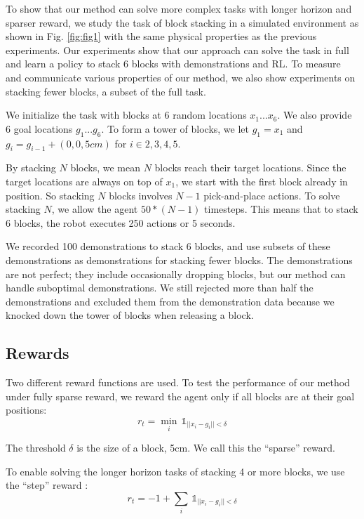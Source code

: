To show that our method can solve more complex tasks with longer horizon and sparser reward, we study %
the task of block stacking in a simulated  environment as shown in Fig. \ref{fig:fig1} with the same physical properties as the previous experiments. Our experiments show that our approach can solve the task in full and learn a policy to stack 6 blocks with demonstrations and RL.  To measure and communicate various properties of our method, we also show experiments on stacking fewer blocks, a subset of the full task.

We initialize the task with blocks at 6 random locations $x_1 ... x_6$. We also provide 6 goal locations $g_1 ... g_6$. To form a tower of blocks, we let $g_1 = x_1$ and $g_i = g_{i-1} + (0, 0, 5cm)$ for $i \in 2, 3, 4, 5$.

By stacking $N$ blocks, we mean $N$ blocks reach their target locations. Since the target locations are always on top of $x_1$, we start with the first block already in position. So stacking $N$ blocks involves $N-1$ pick-and-place actions. To solve stacking $N$, we allow the agent $50 * (N-1)$ timesteps. This means that to stack 6 blocks, the robot executes 250 actions or 5 seconds.

We recorded 100 demonstrations to stack 6 blocks, and use subsets of these demonstrations as demonstrations for stacking fewer blocks. The demonstrations are not perfect; they include occasionally dropping blocks, but our method can handle suboptimal demonstrations. We still rejected more than half the demonstrations and excluded them from the demonstration data because we knocked down the tower of blocks when releasing a block.

\subsection{Rewards}

Two different reward functions are used. To test the performance of our method under fully sparse reward, we reward the agent only if all blocks are at their goal positions:
\begin{equation}
    r_t = \min_i \, \mathds{1}_{||x_i - g_i|| < \delta}
\end{equation}

\noindent The threshold $\delta$ is the size of a block, 5cm. We call this the ``sparse'' reward.

To enable solving the longer horizon tasks of stacking 4 or more blocks, we use the ``step'' reward :
\begin{equation}
    r_t = -1 + \sum_i \, \mathds{1}_{||x_i - g_i|| < \delta}
\end{equation}

